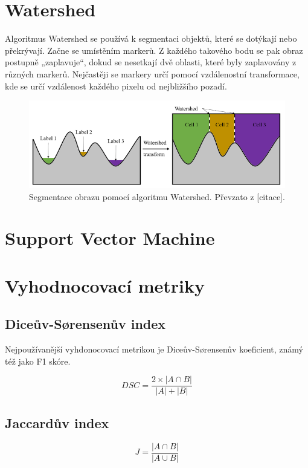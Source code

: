 \section{Watershed}

Algoritmus Watershed se používá k segmentaci objektů, které se dotýkají nebo překrývají.
Začne se umístěním markerů. Z každého takového bodu se pak obraz postupně „zaplavuje“, dokud se nesetkají dvě oblasti, které byly zaplavovány z různých markerů.
Nejčastěji se markery určí pomocí vzdálenostní transformace, kde se určí vzdálenost každého pixelu od nejbližšího pozadí.

\begin{figure}[H]
    \centering
    \includegraphics[width=\textwidth]{static/obrazky/watershed_process.png}
    \caption{Segmentace obrazu pomocí algoritmu Watershed. Převzato z [citace].}
    \label{fig:watershed}
    
\end{figure}


\section{Support Vector Machine}




\section{Vyhodnocovací metriky}

\subsection{Diceův-Sørensenův index}

Nejpoužívanější vyhdonocovací metrikou je Diceův-Sørensenův koeficient, známý též jako F1 skóre.

$$DSC = \frac{2 \times |A \cap B|}{|A| + |B|}$$

\subsection{Jaccardův index}



$$J = \frac{|A \cap B|}{|A \cup B|}$$